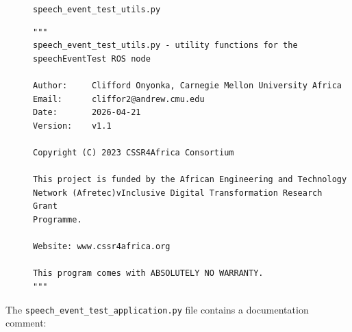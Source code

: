 \documentclass{CSSRforAfrica}
\newcommand{\blank}{~\\}
\newcommand{\checkboxChecked}{\fbox{\ding{51}}} %
\begin{document}
\begin{description}
\item[\checkboxChecked]  {\small \verb+speech_event_test_utils.py+} 
{\small \begin{verbatim}
"""
speech_event_test_utils.py - utility functions for the speechEventTest ROS node

Author:     Clifford Onyonka, Carnegie Mellon University Africa
Email:      cliffor2@andrew.cmu.edu
Date:       2026-04-21
Version:    v1.1

Copyright (C) 2023 CSSR4Africa Consortium

This project is funded by the African Engineering and Technology
Network (Afretec)vInclusive Digital Transformation Research Grant
Programme.

Website: www.cssr4africa.org

This program comes with ABSOLUTELY NO WARRANTY.
"""

\end{verbatim} }
\end{description} 

\noindent The {\small \verb+speech_event_test_application.py+} file contains a documentation comment:
\end{document}
